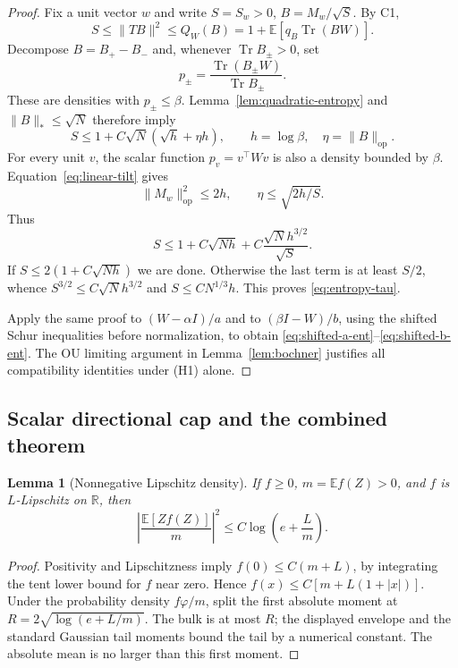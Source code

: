 \documentclass[11pt]{article}
\numberwithin{equation}{section}
\newtheorem{lemma}[theorem]{Lemma}
\DeclareMathOperator{\Tr}{Tr}
\newcommand{\E}{\mathbb E}
\newcommand{\R}{\mathbb R}
\newcommand{\op}{\mathrm{op}}
\begin{document}
\begin{proof}
Fix a unit vector $w$ and write $S=S_w>0$, $B=M_w/\sqrt S$.  By C1,
\begin{equation}\label{eq:S-Q}
 S\le\|TB\|^2\le Q_W(B)
 =1+\E[q_B\Tr(BW)].
\end{equation}
Decompose $B=B_+-B_-$ and, whenever $\Tr B_\pm>0$, set
\[
 p_\pm=\frac{\Tr(B_\pm W)}{\Tr B_\pm}.
\]
These are densities with $p_\pm\le\beta$.  Lemma~\ref{lem:quadratic-entropy}
and $\|B\|_*\le\sqrt N$ therefore imply
\begin{equation}\label{eq:self-consistency-1}
 S\le1+C\sqrt N(\sqrt h+\eta h),\qquad
 h=\log\beta,\quad \eta=\|B\|_{\op}.
\end{equation}
For every unit $v$, the scalar function $p_v=v^\top Wv$ is also a density
bounded by $\beta$.  Equation~\eqref{eq:linear-tilt} gives
\begin{equation}\label{eq:M-op-entropy}
 \|M_w\|_{\op}^2\le2h,\qquad
 \eta\le\sqrt{2h/S}.
\end{equation}
Thus
\begin{equation}\label{eq:cubic-S}
 S\le1+C\sqrt{Nh}+C\frac{\sqrt N h^{3/2}}{\sqrt S}.
\end{equation}
If $S\le2(1+C\sqrt{Nh})$ we are done.  Otherwise the last term is at least
$S/2$, whence $S^{3/2}\le C\sqrt N h^{3/2}$ and
$S\le CN^{1/3}h$.  This proves \eqref{eq:entropy-tau}.

Apply the same proof to $(W-\alpha I)/a$ and to
$(\beta I-W)/b$, using the shifted Schur inequalities before normalization,
to obtain \eqref{eq:shifted-a-ent}--\eqref{eq:shifted-b-ent}.
The OU limiting argument in Lemma~\ref{lem:bochner} justifies all
compatibility identities under (H1) alone.
\end{proof}

\subsection{Scalar directional cap and the combined theorem}

\begin{lemma}[Nonnegative Lipschitz density]\label{lem:lip-density}
If $f\ge0$, $m=\E f(Z)>0$, and $f$ is $L$-Lipschitz on $\R$, then
\begin{equation}\label{eq:lip-density}
 \left|\frac{\E[Zf(Z)]}{m}\right|^2
 \le C\log\left(e+\frac Lm\right).
\end{equation}
\end{lemma}

\begin{proof}
Positivity and Lipschitzness imply $f(0)\le C(m+L)$, by integrating the
tent lower bound for $f$ near zero.  Hence
$f(x)\le C[m+L(1+|x|)]$.  Under the probability density $f\varphi/m$,
split the first absolute moment at
$R=2\sqrt{\log(e+L/m)}$.  The bulk is at most $R$; the displayed envelope
and the standard Gaussian tail moments bound the tail by a numerical
constant.  The absolute mean is no larger than this first moment.
\end{proof}
\end{document}
